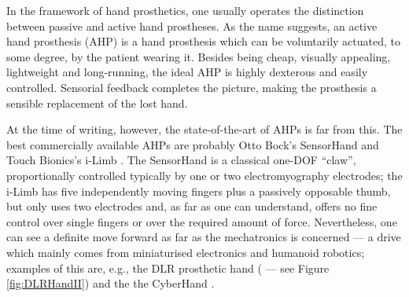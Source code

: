 In the framework of hand prosthetics, one usually operates the
distinction between passive and active hand prostheses. As the name
suggests, an active hand prosthesis (AHP) is a hand prosthesis which
can be voluntarily actuated, to some degree, by the patient wearing
it. Besides being cheap, visually appealing, lightweight and
long-running, the ideal AHP is highly dexterous and easily
controlled. Sensorial feedback completes the picture, making the
prosthesis a sensible replacement of the lost hand.

At the time of writing, however, the state-of-the-art of AHPs is far
from this. The best commercially available AHPs are probably Otto
Bock's SensorHand \cite{sensorhand} and Touch Bionics's i-Limb
\cite{ilimb}. The SensorHand is a classical one-DOF ``claw'',
proportionally controlled typically by one or two electromyography electrodes; the
i-Limb has five independently moving fingers plus a passively
opposable thumb, but only uses two electrodes and, as far as one can
understand, offers no fine control over single fingers or over the
required amount of force. Nevertheless, one can see a definite move
forward as far as the mechatronics is concerned --- a drive which
mainly comes from miniaturised electronics and humanoid robotics;
examples of this are, e.g., the DLR prosthetic hand (\cite{Hua2006}
--- see Figure \ref{fig:DLRHandII}) and the the CyberHand
\cite{cyberhand}.

